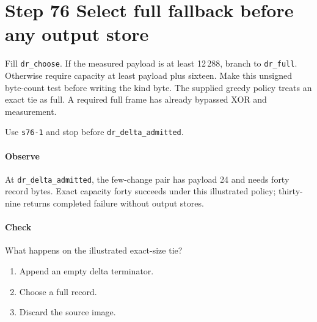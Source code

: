 \section{Step 76 Select full fallback before any output store}
Fill \texttt{dr\_choose}. If the measured payload is at least 12\,288, branch to \texttt{dr\_full}. Otherwise require capacity at least payload plus sixteen. Make this unsigned byte-count test before writing the kind byte. The supplied greedy policy treats an exact tie as full. A required full frame has already bypassed XOR and measurement.

Use \texttt{s76-1} and stop before \texttt{dr\_delta\_admitted}.

\paragraph{Observe} At \texttt{dr\_delta\_admitted}, the few-change pair has payload 24 and needs forty record bytes. Exact capacity forty succeeds under this illustrated policy; thirty-nine returns completed failure without output stores.

\paragraph{Check} What happens on the illustrated exact-size tie?
\begin{enumerate}[label=\Alph*.]
  \item Append an empty delta terminator.
  \item Choose a full record.
  \item Discard the source image.
\end{enumerate}
